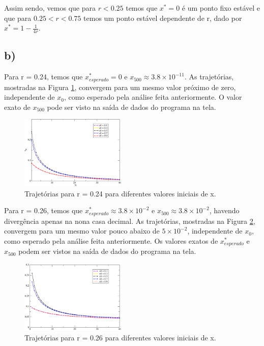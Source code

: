 \documentclass[a4wide]{report}
\begin{document}
Assim sendo, vemos que para $r < 0.25$ temos que $x^* = 0$ é um ponto fixo estável e que para $0.25 < r < 0.75$ temos um ponto estável dependente de r, dado por  $x^* = 1 - \frac{1}{4r}$.

\subsection*{b)}

Para r = 0.24, temos que $x_{esperado}^{*} = 0$ e $x_{500} \approx 3.8\times10^{-11}$. As trajetórias, mostradas na Figura \ref{a1}, convergem para um mesmo valor próximo de zero, independente de $x_0$, como esperado pela análise feita anteriormente. O valor exato de $x_{500}$ pode ser visto na saída de dados do programa na tela.
\begin{figure}[!htb]
\centering
\includegraphics[width=0.447\textwidth]{todos.pdf}
\caption{Trajetórias para r = 0.24 para diferentes valores iniciais de x.}
\label{a1}
\end{figure}


Para r = 0.26, temos que $x_{esperado}^{*} \approx 3.8\times10^{-2}$ e $x_{500} \approx 3.8\times10^{-2}$, havendo divergência apenas na nona casa decimal. As trajetórias, mostradas na Figura \ref{a2}, convergem para um mesmo valor pouco abaixo de $5\times10^{-2}$, independente de $x_0$, como esperado pela análise feita anteriormente. Os valores exatos de $x_{esperado}^{*}$ e $x_{500}$ podem ser vistos na saída de dados do programa na tela.
\begin{figure}[!htb]
\centering
\includegraphics[width=0.447\textwidth]{todos26.pdf}
\caption{Trajetórias para r = 0.26 para diferentes valores iniciais de x. }
\label{a2}
\end{figure}
\end{document}
